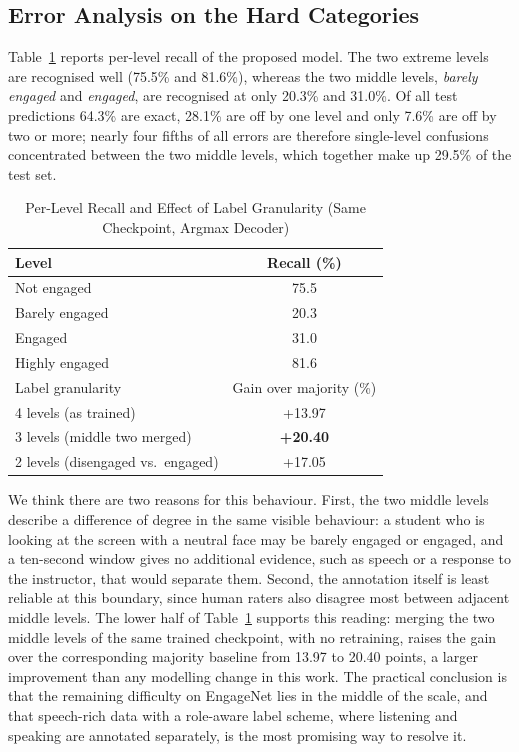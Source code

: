 \documentclass[journal]{IEEEtran}
\begin{document}
\subsection{Error Analysis on the Hard Categories}

Table~\ref{tab_perclass} reports per-level recall of the proposed model. The two extreme levels are recognised well (75.5\% and 81.6\%), whereas the two middle levels, \emph{barely engaged} and \emph{engaged}, are recognised at only 20.3\% and 31.0\%. Of all test predictions 64.3\% are exact, 28.1\% are off by one level and only 7.6\% are off by two or more; nearly four fifths of all errors are therefore single-level confusions concentrated between the two middle levels, which together make up 29.5\% of the test set.

\begin{table}[!t]
\renewcommand{\arraystretch}{1.3}
\caption{Per-Level Recall and Effect of Label Granularity (Same Checkpoint, Argmax Decoder)}
\label{tab_perclass}
\centering
\begin{tabular}{|l|c|}
\hline
Level & Recall (\%)\\
\hline
Not engaged & 75.5\\
Barely engaged & 20.3\\
Engaged & 31.0\\
Highly engaged & 81.6\\
\hline
\hline
Label granularity & Gain over majority (\%)\\
\hline
4 levels (as trained) & +13.97\\
3 levels (middle two merged) & \textbf{+20.40}\\
2 levels (disengaged vs.\ engaged) & +17.05\\
\hline
\end{tabular}
\end{table}

We think there are two reasons for this behaviour. First, the two middle levels describe a difference of degree in the same visible behaviour: a student who is looking at the screen with a neutral face may be barely engaged or engaged, and a ten-second window gives no additional evidence, such as speech or a response to the instructor, that would separate them. Second, the annotation itself is least reliable at this boundary, since human raters also disagree most between adjacent middle levels. The lower half of Table~\ref{tab_perclass} supports this reading: merging the two middle levels of the same trained checkpoint, with no retraining, raises the gain over the corresponding majority baseline from 13.97 to 20.40 points, a larger improvement than any modelling change in this work. The practical conclusion is that the remaining difficulty on EngageNet lies in the middle of the scale, and that speech-rich data with a role-aware label scheme, where listening and speaking are annotated separately, is the most promising way to resolve it.
\end{document}
